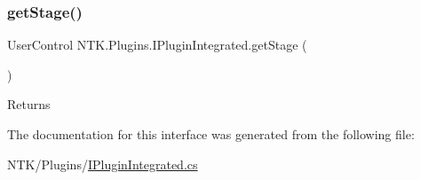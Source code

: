 \subsubsection{\texorpdfstring{getStage()}{getStage()}}
{\footnotesize\ttfamily User\+Control N\+T\+K.\+Plugins.\+I\+Plugin\+Integrated.\+get\+Stage (\begin{DoxyParamCaption}{ }\end{DoxyParamCaption})}





\begin{DoxyReturn}{Returns}

\end{DoxyReturn}


The documentation for this interface was generated from the following file\+:\begin{DoxyCompactItemize}
\item 
N\+T\+K/\+Plugins/\mbox{\hyperlink{_i_plugin_integrated_8cs}{I\+Plugin\+Integrated.\+cs}}\end{DoxyCompactItemize}
